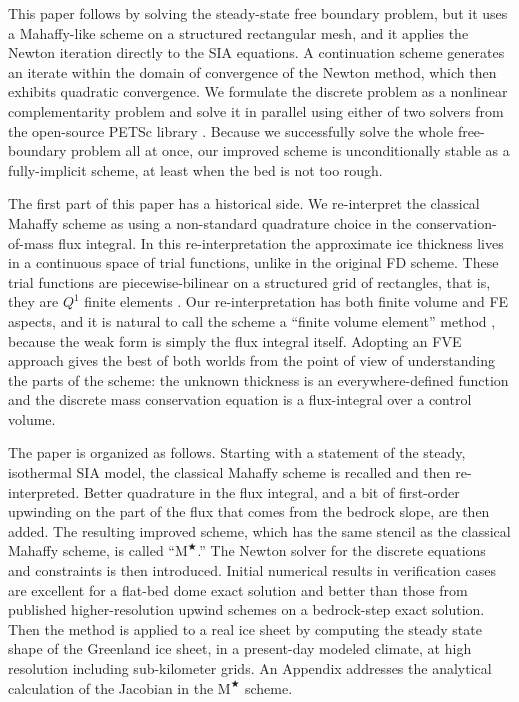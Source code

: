 \documentclass[review,letterpaper]{igs}
\newcommand{\Mstar}{$\text{M}^{\bigstar}$\xspace}
\begin{document}
This paper follows \cite{JouvetBueler2012} by solving the steady-state free boundary problem, but it uses a Mahaffy-like scheme on a structured rectangular mesh, and it applies the Newton iteration directly to the SIA equations.  A continuation scheme generates an iterate within the domain of convergence of the Newton method, which then exhibits quadratic convergence.  We formulate the discrete problem as a nonlinear complementarity problem \citep{BensonMunson2006} and solve it in parallel using either of two solvers from the open-source PETSc library \citep{Balayetal2014}.  Because we successfully solve the whole free-boundary problem all at once, our improved scheme is unconditionally stable as a fully-implicit scheme, at least when the bed is not too rough.

The first part of this paper has a historical side.  We re-interpret the classical Mahaffy scheme as using a non-standard quadrature choice in the conservation-of-mass flux integral.  In this re-interpretation the approximate ice thickness lives in a continuous space of trial functions, unlike in the original FD scheme.  These trial functions are piecewise-bilinear on a structured grid of rectangles, that is, they are $Q^1$ finite elements \citep{Elmanetal2005}.  Our re-interpretation has both finite volume \citep[FV;][]{LeVeque2002} and FE aspects, and it is natural to call the scheme a ``finite volume element'' method \citep[FVE;][]{Cai1990,EwingLinLin2002}, because the weak form is simply the flux integral itself.  Adopting an FVE approach gives the best of both worlds from the point of view of understanding the parts of the scheme: the unknown thickness is an everywhere-defined function and the discrete mass conservation equation is a flux-integral over a control volume.

The paper is organized as follows.  Starting with a statement of the steady, isothermal SIA model, the classical Mahaffy scheme is recalled and then re-interpreted.  Better quadrature in the flux integral, and a bit of first-order upwinding on the part of the flux that comes from the bedrock slope, are then added.  The resulting improved scheme, which has the same stencil as the classical Mahaffy scheme, is called ``\Mstar.''  The Newton solver for the discrete equations and constraints is then introduced.  Initial numerical results in verification cases are excellent for a flat-bed dome exact solution and better than those from published higher-resolution upwind schemes on a bedrock-step exact solution.  Then the method is applied to a real ice sheet by computing the steady state shape of the Greenland ice sheet, in a present-day modeled climate, at high resolution including sub-kilometer grids.  An Appendix addresses the analytical calculation of the Jacobian in the \Mstar scheme.
\end{document}
